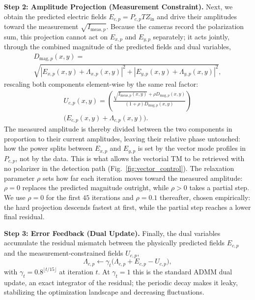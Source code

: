 \documentclass{article}
\begin{document}
\textbf{Step 2: Amplitude Projection (Measurement Constraint).}
Next, we obtain the predicted electric fields $E_{c,p} = P_{c,p} T Z_{\text{in}}$ and drive their amplitudes toward the measurement $\sqrt{I_{\text{meas},p}}$.
Because the cameras record the polarization sum, this projection cannot act on $E_{x,p}$ and $E_{y,p}$ separately; it acts jointly, through the combined magnitude of the predicted fields and dual variables,
\begin{multline}
D_{\text{mag},p}(x,y) = \\ \sqrt{|E_{x,p}(x,y) + \Lambda_{x,p}(x,y)|^2 + |E_{y,p}(x,y) + \Lambda_{y,p}(x,y)|^2},
\end{multline}
rescaling both components element-wise by the same real factor:
\begin{multline}
\label{eq:projection}
U_{c,p}(x,y) = \left( \frac{\sqrt{I_{\text{meas},p}(x,y)} + \rho D_{\text{mag},p}(x,y)}{(1+\rho)D_{\text{mag},p}(x,y)} \right) \\ \big( E_{c,p}(x,y) + \Lambda_{c,p}(x,y) \big).
\end{multline}
The measured amplitude is thereby divided between the two components in proportion to their current amplitudes, leaving their relative phase untouched: how the power splits between $E_{x,p}$ and $E_{y,p}$ is set by the vector mode profiles in $P_{c,p}$, not by the data.
This is what allows the vectorial TM to be retrieved with no polarizer in the detection path (Fig.~\ref{fig:vector_control}).
The relaxation parameter $\rho$ sets how far each iteration moves toward the measured amplitude: $\rho = 0$ replaces the predicted magnitude outright, while $\rho > 0$ takes a partial step.
We use $\rho = 0$ for the first $45$ iterations and $\rho = 0.1$ thereafter, chosen empirically: the hard projection descends fastest at first, while the partial step reaches a lower final residual.

\textbf{Step 3: Error Feedback (Dual Update).}
Finally, the dual variables accumulate the residual mismatch between the physically predicted fields $E_{c,p}$ and the measurement-constrained fields $U_{c,p}$,
\begin{equation}
\label{eq:dual_update}
\Lambda_{c,p} \gets \gamma_t \big( \Lambda_{c,p} + E_{c,p} - U_{c,p} \big),
\end{equation}
with $\gamma_t = 0.8^{\lfloor t/15 \rfloor}$ at iteration $t$.
At $\gamma_t = 1$ this is the standard ADMM dual update, an exact integrator of the residual; the periodic decay makes it leaky, stabilizing the optimization landscape and decreasing fluctuations.
\end{document}
